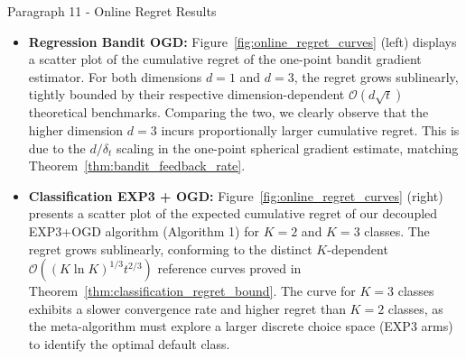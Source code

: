 \begin{sourceblock}{Paragraph 11 - Online Regret Results}
\begin{itemize}
    \item \textbf{Regression Bandit OGD:} Figure~\ref{fig:online_regret_curves} (left) displays a scatter plot of the cumulative regret of the one-point bandit gradient estimator. For both dimensions $d=1$ and $d=3$, the regret grows sublinearly, tightly bounded by their respective dimension-dependent $\mathcal{O}(d\sqrt{t})$ theoretical benchmarks. Comparing the two, we clearly observe that the higher dimension $d=3$ incurs proportionally larger cumulative regret. This is due to the $d/\delta_t$ scaling in the one-point spherical gradient estimate, matching Theorem~\ref{thm:bandit_feedback_rate}.
    \item \textbf{Classification EXP3 + OGD:} Figure~\ref{fig:online_regret_curves} (right) presents a scatter plot of the expected cumulative regret of our decoupled EXP3+OGD algorithm (Algorithm 1) for $K=2$ and $K=3$ classes. The regret grows sublinearly, conforming to the distinct $K$-dependent $\mathcal{O}((K \ln K)^{1/3} t^{2/3})$ reference curves proved in Theorem~\ref{thm:classification_regret_bound}. The curve for $K=3$ classes exhibits a slower convergence rate and higher regret than $K=2$ classes, as the meta-algorithm must explore a larger discrete choice space (EXP3 arms) to identify the optimal default class.
\end{itemize}
\end{sourceblock}

\begin{faqblock}
\faqanswers
{}
\end{faqblock}
